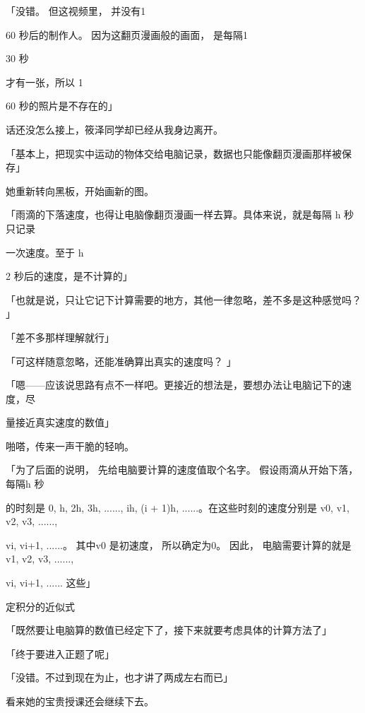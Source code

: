 「没错。 但这视频里， 并没有1\par
60 秒后的制作人。 因为这翻页漫画般的画面， 是每隔1\par
30 秒\par
才有一张，所以 1\par
60 秒的照片是不存在的」\par
话还没怎么接上，筱泽同学却已经从我身边离开。\par
「基本上，把现实中运动的物体交给电脑记录，数据也只能像翻页漫画那样被保存」\par
她重新转向黑板，开始画新的图。\par
「雨滴的下落速度，也得让电脑像翻页漫画一样去算。具体来说，就是每隔 h 秒只记录\par
一次速度。至于 h\par
2 秒后的速度，是不计算的」\par
「也就是说，只让它记下计算需要的地方，其他一律忽略，差不多是这种感觉吗？ 」\par
「差不多那样理解就行」\par
「可这样随意忽略，还能准确算出真实的速度吗？ 」\par
「嗯——应该说思路有点不一样吧。更接近的想法是，要想办法让电脑记下的速度，尽\par
量接近真实速度的数值」\par
啪嗒，传来一声干脆的轻响。\par
「为了后面的说明， 先给电脑要计算的速度值取个名字。 假设雨滴从开始下落， 每隔h 秒\par
的时刻是 0, h, 2h, 3h, ......, ih, (i + 1)h, ......。在这些时刻的速度分别是 v0, v1, v2, v3, ......,\par
vi, vi+1, ......。 其中v0 是初速度， 所以确定为0。 因此， 电脑需要计算的就是v1, v2, v3, ......,\par
vi, vi+1, ...... 这些」\par
定积分的近似式\par
「既然要让电脑算的数值已经定下了，接下来就要考虑具体的计算方法了」\par
「终于要进入正题了呢」\par
「没错。不过到现在为止，也才讲了两成左右而已」\par
看来她的宝贵授课还会继续下去。\par

